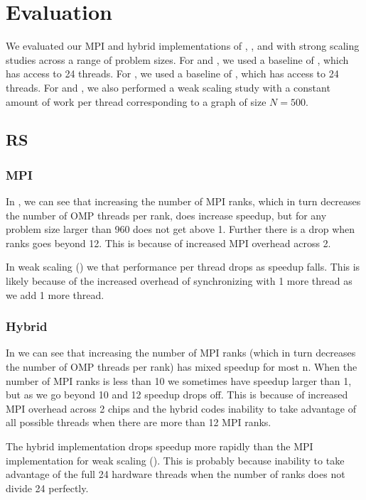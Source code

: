 \section{Evaluation}\label{sec:eval}
We evaluated our MPI and hybrid implementations of \rs{}, \block{}, and \fw{}
with strong scaling studies across a range of problem sizes. For \rs{} and
\block{}, we used a baseline of \rsomp{}, which has access to 24 threads. For
\fw{}, we used a baseline of \fwomp{}, which has access to 24 threads. For
\rs{} and \block{}, we also performed a weak scaling study with a constant
amount of work per thread corresponding to a graph of size $N=500$.

\subsection{RS}
\subsubsection{MPI}
In , we can see that increasing the number of MPI ranks,
which in turn decreases the number of OMP threads per rank, does increase
speedup, but for any problem size larger than 960 does not get above 1. Further
there is a drop when ranks goes beyond 12. This is because of increased MPI
overhead across 2.

In weak scaling () we that performance per thread drops
as speedup falls. This is likely because of the increased overhead of
synchronizing with 1 more thread as we add 1 more thread.

\subsubsection{Hybrid}
In  we can see that increasing the number of MPI
ranks (which in turn decreases the number of OMP threads per rank) has mixed
speedup for most n. When the number of MPI ranks is less than 10 we sometimes
have speedup larger than 1, but as we go beyond 10 and 12 speedup drops off.
This is because of increased MPI overhead across 2 chips and the hybrid codes
inability to take advantage of all possible threads when there are more than 12
MPI ranks.

The hybrid implementation drops speedup more rapidly than the MPI implementation
for weak scaling (). This is probably because
inability to take advantage of the full 24 hardware threads when the number of
ranks does not divide 24 perfectly.

